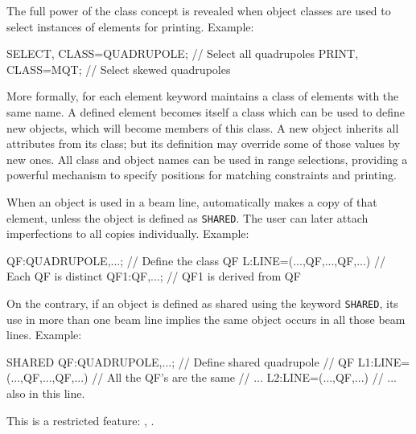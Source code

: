 The full power of the class concept is revealed when object classes
are used to select  instances of elements for printing.
\noindent Example:
\begin{example}
SELECT, CLASS=QUADRUPOLE;  // Select all quadrupoles
PRINT, CLASS=MQT;          // Select skewed quadrupoles
\end{example}

More formally, for each element keyword \opal maintains a class of
elements with the same name.
A defined element becomes itself a class which can be used to define
new objects,
which will become members of this class.
A new object inherits all attributes from its class;
but its definition may override some of those values by new ones.
All class and object names can be used in range selections,
providing a powerful mechanism to specify positions
for matching constraints and printing.

When an object is used in a beam line,
\opal automatically makes a copy of that element,
unless the object is defined as \texttt{SHARED}.
The user can later attach imperfections to all copies individually.
Example:
\begin{example}
QF:QUADRUPOLE,...;          // Define the class QF
L:LINE=(...,QF,...,QF,...)  // Each QF is distinct
QF1:QF,...;                 // QF1 is derived from QF
\end{example}

On the contrary, if an object is defined as shared using the keyword
\texttt{SHARED},
its use in more than one beam line implies the same object occurs
in all those beam lines.
Example:
\begin{example}
SHARED QF:QUADRUPOLE,...;   // Define shared quadrupole
                            // QF
L1:LINE=(...,QF,...,QF,...) // All the QF's are the same
                            // ...
L2:LINE=(...,QF,...)        // ... also in this line.
\end{example}
This is a restricted feature: \noopalt, \noopalcycl.


